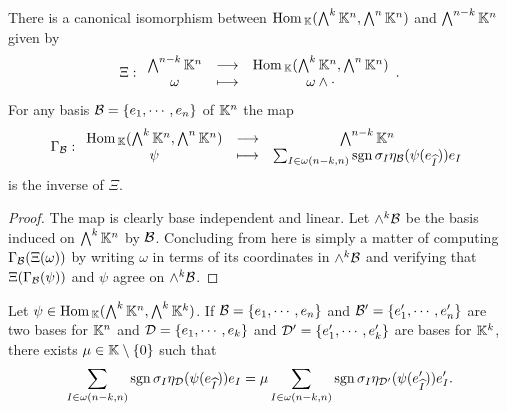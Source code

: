 \begin{proposition}\label{CanonicalIso}
There is a canonical isomorphism between $\mathrm{Hom}\,_{\mathbb{K}}(\bigwedge^k\mathbb{K}^n,\bigwedge^n\mathbb{K}^n)$ and $\bigwedge^{n-k}\mathbb{K}^n$ given by
\[\Xi:\begin{array}{ccc} {\bigwedge^{n-k}\mathbb{K}^n} & \longrightarrow & {\mathrm{Hom}\,_{\mathbb{K}}(\bigwedge^k\mathbb{K}^n, \bigwedge^n\mathbb{K}^n)}\\ {\omega} & \longmapsto & {\omega\wedge \cdot} \end{array}.\]
For any basis $\mathcal{B}=\left\{{e_1,\cdots, e_n}\right\}$ of $\mathbb{K}^n$ the map 
\[\Gamma_{\mathcal{B}}:\begin{array}{ccc} {\mathrm{Hom}\,_{\mathbb{K}}(\bigwedge^k\mathbb{K}^n,\bigwedge^n\mathbb{K}^n)} & \longrightarrow & {\bigwedge^{n-k}\mathbb{K}^n}\\ {\psi} & \longmapsto & {\sum_{I\in\omega(n-k,n)}\mathrm{sgn}\,\sigma_I\eta_{\mathcal{B}}(\psi(e_{\widehat{I}}))e_I} \end{array}\]
is the inverse of $\Xi$.
\end{proposition}
\begin{proof}
The map is clearly base independent and linear. Let $\wedge^k\mathcal{B}$ be the basis induced on $\bigwedge^k\mathbb{K}^n$ by $\mathcal{B}$. Concluding from here is simply a matter of computing $\Gamma_{\mathcal{B}}(\Xi(\omega))$ by writing $\omega$ in terms of its coordinates in $\wedge^k\mathcal{B}$ and verifying that $\Xi(\Gamma_{\mathcal{B}}(\psi))$ and $\psi$ agree on $\wedge^k\mathcal{B}$. 

\end{proof}
\begin{corollary}\label{UpToScalarCanonicalIso}
Let $\psi\in \mathrm{Hom}\,_{\mathbb{K}}(\bigwedge^k\mathbb{K}^n,\bigwedge^k\mathbb{K}^k)$. If $\mathcal{B}=\left\{{e_1,\cdots, e_n}\right\}$ and $\mathcal{B}'=\left\{{e_1',\cdots, e_n'}\right\}$ are two bases for $\mathbb{K}^n$ and $\mathcal{D}=\left\{{e_1,\cdots,e_k}\right\}$ and $\mathcal{D}'=\left\{{e_1',\cdots,e_k'}\right\}$ are bases for $\mathbb{K}^k$, there exists $\mu\in\mathbb{K}\setminus\{0\}$ such that
\[\sum_{I\in\omega(n-k,n)}\mathrm{sgn}\,\sigma_I\eta_{\mathcal{D}}(\psi(e_{\widehat{I}}))e_I=\mu \sum_{I\in\omega(n-k,n)}\mathrm{sgn}\,\sigma_I\eta_{\mathcal{D}'}(\psi(e'_{\widehat{I}}))e'_I.\]
\end{corollary}
